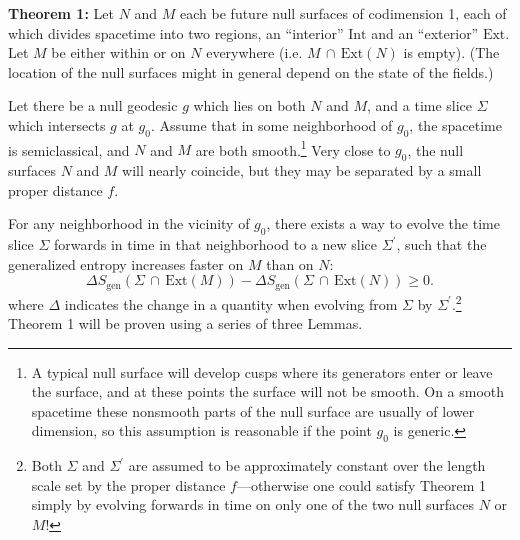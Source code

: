 \documentclass[12pt]{article}
\begin{document}
\textbf{Theorem 1:}  Let $N$ and $M$ each be future null surfaces of codimension 1, each of which divides spacetime into two regions, an ``interior'' $\mathrm{Int}$ and an ``exterior'' $\mathrm{Ext}$.  Let $M$ be either within or on $N$ everywhere (i.e. $M\,\cap\,\mathrm{Ext}(N)$ is empty).  (The location of the null surfaces might in general depend on the state of the fields.)

Let there be a null geodesic $g$ which lies on both $N$ and $M$, and a time slice $\Sigma$ which intersects $g$ at $g_0$.  Assume that in some neighborhood of $g_0$, the spacetime is semiclassical, and $N$ and $M$ are both smooth.\footnote{A typical null surface will develop cusps where its generators enter or leave the surface, and at these points the surface will not be smooth.  On a smooth spacetime these nonsmooth parts of the null surface are usually of lower dimension, so this assumption is reasonable if the point $g_0$ is generic.}  Very close to $g_0$, the null surfaces $N$ and $M$ will nearly coincide, but they may be separated by a small proper distance $f$.

For any neighborhood in the vicinity of $g_0$, there exists a way to evolve the time slice
$\Sigma$ forwards in time in that neighborhood to a new slice $\Sigma^\prime$, such that the generalized entropy increases faster on $M$ than on $N$:
\begin{equation}\label{ft}
\Delta S_\mathrm{gen}(\Sigma\,\cap\,\mathrm{Ext}(M)) - 
\Delta S_\mathrm{gen}(\Sigma\,\cap\,\mathrm{Ext}(N)) \ge 0.
\end{equation}
where $\Delta$ indicates the change in a quantity when evolving from $\Sigma$ by $\Sigma^\prime$.\footnote{Both $\Sigma$ and $\Sigma^\prime$ are assumed to be approximately constant over the length scale set by the proper distance $f$---otherwise one could satisfy Theorem 1 simply by evolving forwards in time on only one of the two null surfaces $N$ or $M$!}  Theorem 1 will be proven using a series of three Lemmas.
\end{document}
